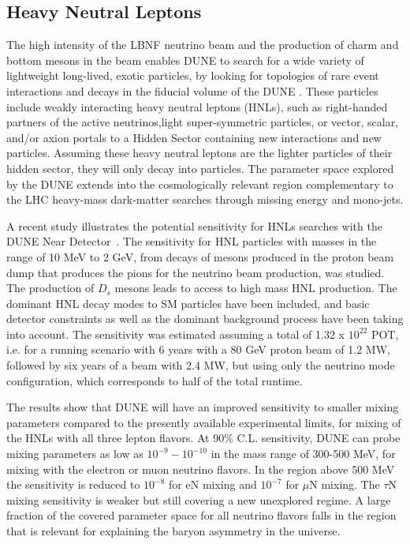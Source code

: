 \subsection{Heavy Neutral Leptons}
The high intensity of the LBNF neutrino beam and the production of charm and bottom mesons in the beam enables DUNE to search for a wide variety of lightweight long-lived, exotic particles, by looking for topologies of rare event interactions and decays in the fiducial volume of the DUNE . These particles include weakly interacting heavy neutral leptons (HNLs), such as right-handed partners of the active neutrinos,light super-symmetric particles, or vector, scalar, and/or axion portals to a Hidden Sector containing new interactions and new particles. 
Assuming these heavy neutral leptons are the lighter particles of their hidden sector, they will only decay into   particles. The parameter space explored by the DUNE   extends into the cosmologically relevant region complementary to the LHC heavy-mass dark-matter searches through missing energy and mono-jets.

A recent study illustrates the potential sensitivity for  HNLs searches with the DUNE Near Detector~\cite{Ballett:2019bgd}. The sensitivity for HNL particles with masses in the range of 10 MeV to 2 GeV, from decays of mesons produced
in the proton beam dump that produces the pions for the neutrino beam production, was studied. The production
of $D_s$ mesons leads to access to high mass HNL production. The dominant HNL decay modes to SM particles 
have been included, and basic detector constraints as well as the dominant background process have 
been taking into account. The sensitivity was estimated assuming a total of  1.32 x $10^{22}$ POT, i.e. 
for a
running scenario with 6 years with a 80 GeV proton beam of 1.2 MW, followed by six years of a beam with 
2.4 MW, but using only the neutrino mode configuration, which corresponds to half of the total
runtime.

The results show that DUNE will have an improved sensitivity to smaller
mixing parameters compared to the presently available experimental
limits, for mixing of the HNLs 
with all three lepton flavors. At 90\% C.L. sensitivity, DUNE can probe mixing parameters as low as 
$10^{-9}-10^{-10}$ in the mass range of 300-500 MeV, for  mixing with the electron or muon neutrino flavors. In the region above 500 MeV the sensitivity
is reduced to $10^{-8}$ for eN mixing and $10^{-7}$ for $\mu$N mixing. The $\tau$N mixing 
sensitivity is weaker but still covering a new unexplored regime. A large fraction of the covered parameter space for all neutrino flavors falls in
the region that is relevant for explaining the baryon asymmetry in the universe.

